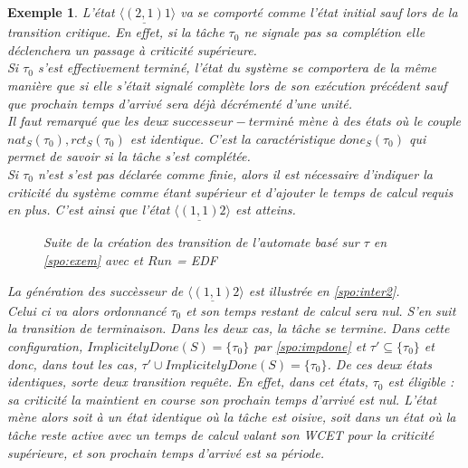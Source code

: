 \documentclass[12pt,a4paper,oneside]{book}
\theoremstyle{break}
\newtheorem{exem}{Exemple}[chapter]
\theoremstyle{breakplain}
\begin{document}
\begin{exem}
L'état $\langle \underline{(2, 1)} 1 \rangle$ va se comporté comme l'état initial sauf lors de la transition critique. En effet, si la tâche $\tau_0$ ne signale pas sa complétion elle déclenchera un passage à criticité supérieure.\\
Si $\tau_0$ s'est effectivement terminé, l'état du système se comportera de la même manière que si elle s'était signalé complète lors de son exécution précédent sauf que prochain temps d'arrivé sera déjà décrémenté d'une unité.\\
Il faut remarqué que les deux $successeur-terminé$ mène à des états où le couple $nat_S(\tau_0), rct_S(\tau_0)$ est identique. C'est la caractéristique $done_S(\tau_0)$ qui permet de savoir si la tâche s'est complétée.\\

Si $\tau_0$ n'est s'est pas déclarée comme finie, alors il est nécessaire d'indiquer la criticité du système comme étant supérieur et d'ajouter le temps de calcul requis en plus. C'est ainsi que l'état $ \langle \underline{(1, 1)} 2 \rangle $ est atteins.

\begin{figure}[h]

    \centering
    \def\svgwidth{\columnwidth}
    
    
\caption{Suite de la création des transition de l'automate basé sur $\tau$ en \autoref{spo:exem} avec et $Run$ = EDF}
\label{spo:inter2}

\end{figure}



La génération des succèsseur de $\langle \underline{(1, 1)} 2 \rangle $ est illustrée en \autoref{spo:inter2}.\\
Celui ci va alors ordonnancé $\tau_0$ et son temps restant de calcul sera nul. S'en suit la transition de terminaison. Dans les deux cas, la tâche se termine. Dans cette configuration, $ImplicitelyDone(S) = \{\tau_0\}$ par \autoref{spo:impdone} et $\tau' \subseteq \{\tau_0\}$ et donc, dans tout les cas, $\tau' \cup ImplicitelyDone(S) = \{\tau_0\}$. De ces deux états identiques, sorte deux transition requête. En effet, dans cet états, $\tau_0$ est éligible : sa criticité la maintient en course son prochain temps d'arrivé est nul. L'état mène alors soit à un état identique où la tâche est oisive, soit dans un état où la tâche reste active avec un temps de calcul valant son WCET pour la criticité supérieure, et son prochain temps d'arrivé est sa période.\\


\end{exem}
\end{document}
